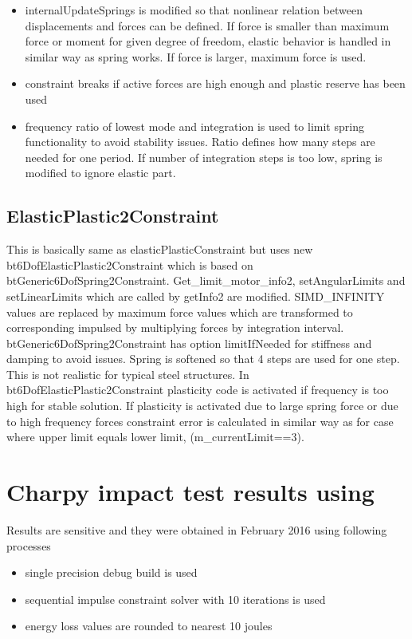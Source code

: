 \begin{itemize}
\item internalUpdateSprings is modified so that nonlinear relation between displacements and forces can be defined. 
 If force is smaller than maximum force or moment for given degree of freedom,
  elastic behavior is handled in similar way as spring works. 
  If force is larger, maximum force is used. 
\item constraint breaks if active forces are high enough and plastic reserve has been used
\item frequency ratio of lowest mode and integration is used to limit spring functionality to avoid stability issues. 
 Ratio defines how many steps are needed for one period. 
 If number of integration steps is too low, spring is modified to ignore elastic part.
\end{itemize}

\subsection{ElasticPlastic2Constraint}
This is basically same as elasticPlasticConstraint but uses new bt6DofElasticPlastic2Constraint 
which is based on btGeneric6DofSpring2Constraint.
Get\_limit\_motor\_info2, setAngularLimits and setLinearLimits which are called by getInfo2 are modified. 
SIMD\_INFINITY values are replaced by maximum force values which are transformed to
corresponding impulsed by multiplying forces by integration interval.
btGeneric6DofSpring2Constraint has option limitIfNeeded for stiffness and damping to avoid issues. 
Spring is softened so that 4 steps are used for one step. This is not realistic for typical steel structures. 
In bt6DofElasticPlastic2Constraint plasticity code is activated if frequency is too high for stable solution.
If plasticity is activated due to large spring force or due to high frequency forces constraint error is 
calculated in similar way as for case where upper limit equals lower limit, (m\_currentLimit==3).

\section{Charpy impact test results using \cbullet}
\label{sec:bullet-charpy-results}
Results are sensitive and they were obtained in February 2016 using following processes
\begin{itemize}
\item single precision debug build is used
\item sequential impulse constraint solver with 10 iterations is used
\item energy loss values are rounded to nearest 10 joules 
\end{itemize}

